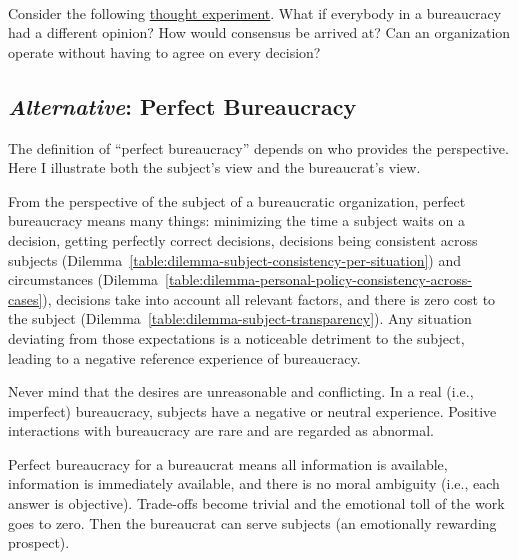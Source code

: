 \ \\

Consider the following 
\href{https://en.wikipedia.org/wiki/Thought_experiment}{thought experiment}. 
\iftoggle{WPinmargin}{\marginpar{$>$Wikipedia: thought experiment}}{}
What if everybody in a bureaucracy had a different opinion? How would consensus be arrived at? Can an organization operate without having to agree on every decision? 



\subsection*{\textit{Alternative}: Perfect Bureaucracy}

The definition of ``perfect bureaucracy'' depends on who provides the perspective. Here I illustrate both the subject's view and the bureaucrat's view. 

From the perspective of the subject of a bureaucratic organization, perfect bureaucracy means many things: minimizing the time a subject waits on a decision, getting perfectly correct decisions, decisions being consistent across subjects (Dilemma~\ref{table:dilemma-subject-consistency-per-situation})
%
and circumstances (Dilemma~\ref{table:dilemma-personal-policy-consistency-across-cases}), decisions take into account all relevant factors, and there is zero cost to the subject (Dilemma~\ref{table:dilemma-subject-transparency}). 
%
Any situation deviating from those expectations is a noticeable detriment to the subject, leading to a negative reference experience of bureaucracy. 

Never mind that the desires are unreasonable and conflicting. In a real (i.e., imperfect) bureaucracy, subjects have a negative or neutral experience. Positive interactions with bureaucracy are rare and are regarded as abnormal.

Perfect bureaucracy for a bureaucrat means all information is available, information is immediately available, and there is no moral ambiguity (i.e., each answer is objective). Trade-offs become trivial and the emotional toll of the work goes to zero. Then the bureaucrat can serve subjects (an emotionally rewarding prospect). 

